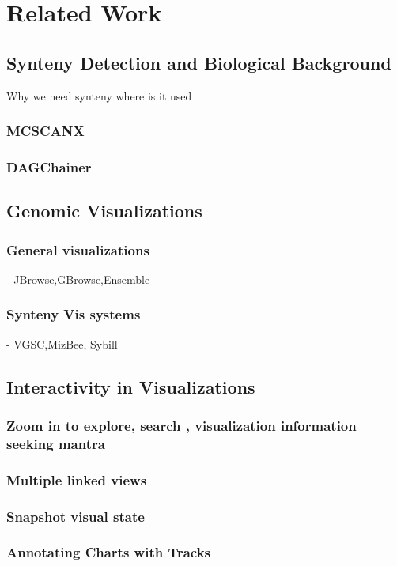 \chapter{Related Work}


\section{Synteny Detection and Biological Background}
Why we need synteny where is it used
\subsection{MCSCANX}
\subsection{DAGChainer}

\section{Genomic Visualizations} 
\subsection{General visualizations} - JBrowse,GBrowse,Ensemble
\subsection{Synteny Vis systems} - VGSC,MizBee, Sybill

\section{Interactivity in Visualizations}
\subsection{Zoom in to explore, search , visualization information seeking mantra}
\subsection{Multiple linked views}
\subsection{Snapshot visual state}
\subsection{Annotating Charts with Tracks}

